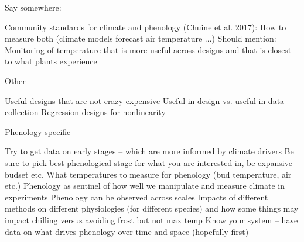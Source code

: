 \documentclass[11pt]{article}
\begin{document}
Say somewhere:

    Community standards for climate and phenology (Chuine et al. 2017): How to measure both (climate models forecast air temperature ...)
    Should mention: Monitoring of temperature that is more useful across designs and that is closest to what plants experience

Other

    Useful designs that are not crazy expensive
    Useful in design vs. useful in data collection
    Regression designs for nonlinearity

Phenology-specific

    Try to get data on early stages -- which are more informed by climate drivers
    Be sure to pick best phenological stage for what you are interested in, be expansive -- budset etc.
    What temperatures to measure for phenology (bud temperature, air etc.)
    Phenology as sentinel of how well we manipulate and measure climate in experiments
    Phenology can be observed across scales
    Impacts of different methods on different physiologies (for different species) and how some things may impact chilling versus avoiding frost but not max temp
    Know your system -- have data on what drives phenology over time and space (hopefully first)

\end{document}
